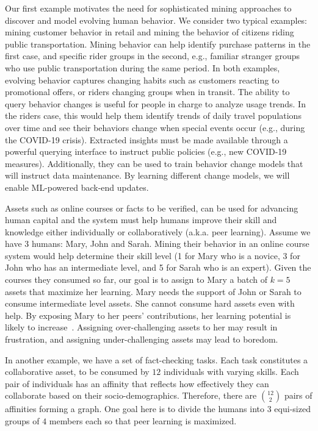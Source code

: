 \documentclass[11pt]{article}
\begin{document}
\begin{example}\label{ex1}
Our first example motivates the need for sophisticated mining approaches to discover and model evolving human behavior. We consider two typical examples: mining customer behavior in retail and mining the behavior of citizens riding public transportation. Mining behavior can help identify purchase patterns in the first case, and specific rider groups in the second, e.g., familiar stranger groups who use public transportation during the same period. In both examples, evolving behavior captures changing habits such as customers reacting to promotional offers, or riders changing groups when in transit. The ability to query behavior changes is useful for people in charge to analyze usage trends. In the riders case, this would help them identify trends of daily travel populations over time and see their behaviors change when special events occur (e.g., during the COVID-19 crisis). Extracted insights must be made available through a powerful querying interface to instruct public policies (e.g., new COVID-19 measures). Additionally, they can be used to train behavior change models that will instruct data maintenance. By learning different change models, we will enable ML-powered back-end updates.
\end{example}

\begin{example}\label{ex2}
Assets such as online courses or facts to be verified, can be used for advancing human capital and the system must help humans improve their skill and knowledge either individually or collaboratively (a.k.a. peer learning).
Assume we have 3 humans: Mary, John and Sarah. Mining their behavior in an online course system would help determine their skill level (1 for Mary who is a novice, 3 for John who has an intermediate level, and 5 for Sarah who is an expert). Given the courses they consumed so far, our goal is to assign to Mary a batch of $k=5$ assets that maximize her learning. Mary needs the support of John or Sarah to consume intermediate level assets. She cannot consume hard assets even with help. By exposing Mary to her peers' contributions, her learning potential is likely to increase~\cite{DKK+12}. Assigning over-challenging assets to her may result in frustration, and assigning under-challenging assets may lead to boredom.

In another example, we have a set of fact-checking tasks. Each task constitutes a collaborative asset, to be consumed by $12$ individuals with varying skills.  Each pair of individuals has an affinity that reflects how effectively they can collaborate based on their socio-demographics. Therefore, there are $12 \choose 2$ pairs of affinities forming a graph. One goal here is to divide the humans into $3$ equi-sized groups of $4$ members each so that peer learning is maximized.
\end{example}
\end{document}
